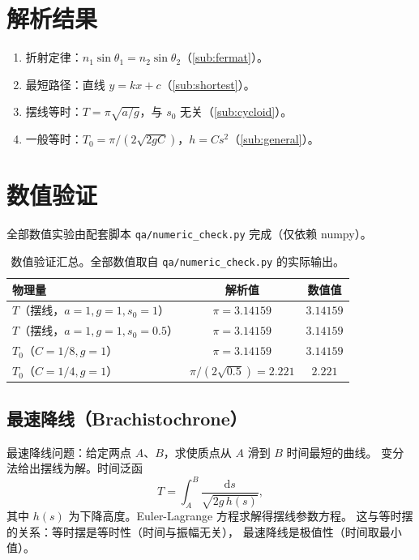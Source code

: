 \documentclass[UTF8,a4paper,11pt]{ctexart}
\begin{document}
\section{解析结果}
\label{sec:result}

\begin{enumerate}
  \item 折射定律：$n_1\sin\theta_1=n_2\sin\theta_2$（\eqref{sub:fermat}）。
  \item 最短路径：直线 $y=kx+c$（\eqref{sub:shortest}）。
  \item 摆线等时：$T=\pi\sqrt{a/g}$，与 $s_0$ 无关（\eqref{sub:cycloid}）。
  \item 一般等时：$T_0=\pi/(2\sqrt{2gC})$，$h=C s^2$（\eqref{sub:general}）。
\end{enumerate}

\section{数值验证}
\label{sec:numeric}

全部数值实验由配套脚本 \texttt{qa/numeric\_check.py} 完成（仅依赖 numpy）。

\begin{table}[htbp]
\centering
\small
\begin{tabular}{p{5cm}cc}
\toprule
物理量 & 解析值 & 数值值 \\
\midrule
$T$（摆线，$a=1,g=1,s_0=1$） & $\pi=3.14159$ & $3.14159$ \\
$T$（摆线，$a=1,g=1,s_0=0.5$） & $\pi=3.14159$ & $3.14159$ \\
$T_0$（$C=1/8,g=1$） & $\pi=3.14159$ & $3.14159$ \\
$T_0$（$C=1/4,g=1$） & $\pi/(2\sqrt{0.5})=2.221$ & $2.221$ \\
\bottomrule
\end{tabular}
\caption{数值验证汇总。全部数值取自 \texttt{qa/numeric\_check.py} 的实际输出。}
\label{tab:numeric}
\end{table}

\subsection{最速降线（Brachistochrone）}
\label{sub:brachistochrone}

最速降线问题：给定两点 $A$、$B$，求使质点从 $A$ 滑到 $B$ 时间最短的曲线。
变分法给出摆线为解。时间泛函
\begin{equation}
  T=\int_A^B \frac{\mathrm ds}{\sqrt{2g\,h(s)}},
\end{equation}
其中 $h(s)$ 为下降高度。Euler-Lagrange 方程求解得摆线参数方程。
这与等时摆的关系：等时摆是等时性（时间与振幅无关），
最速降线是极值性（时间取最小值）。
\end{document}
